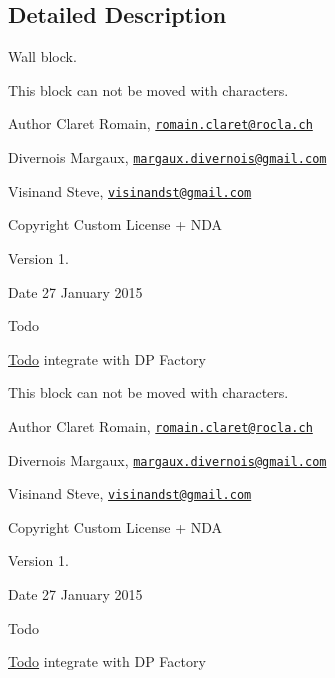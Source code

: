 \subsection{Detailed Description}
Wall block. 

This block can not be moved with characters. \begin{DoxyAuthor}{Author}
Claret Romain, \href{mailto:romain.claret@rocla.ch}{\tt romain.\+claret@rocla.\+ch} 

Divernois Margaux, \href{mailto:margaux.divernois@gmail.com}{\tt margaux.\+divernois@gmail.\+com} 

Visinand Steve, \href{mailto:visinandst@gmail.com}{\tt visinandst@gmail.\+com} 
\end{DoxyAuthor}
\begin{DoxyCopyright}{Copyright}
Custom License + N\+D\+A 
\end{DoxyCopyright}
\begin{DoxyVersion}{Version}
1. 
\end{DoxyVersion}
\begin{DoxyDate}{Date}
27 January 2015 
\end{DoxyDate}
\begin{DoxyRefDesc}{Todo}
\item[\hyperlink{todo__todo000002}{Todo}]integrate with D\+P Factory \end{DoxyRefDesc}


This block can not be moved with characters. \begin{DoxyAuthor}{Author}
Claret Romain, \href{mailto:romain.claret@rocla.ch}{\tt romain.\+claret@rocla.\+ch} 

Divernois Margaux, \href{mailto:margaux.divernois@gmail.com}{\tt margaux.\+divernois@gmail.\+com} 

Visinand Steve, \href{mailto:visinandst@gmail.com}{\tt visinandst@gmail.\+com} 
\end{DoxyAuthor}
\begin{DoxyCopyright}{Copyright}
Custom License + N\+D\+A 
\end{DoxyCopyright}
\begin{DoxyVersion}{Version}
1. 
\end{DoxyVersion}
\begin{DoxyDate}{Date}
27 January 2015 
\end{DoxyDate}
\begin{DoxyRefDesc}{Todo}
\item[\hyperlink{todo__todo000011}{Todo}]integrate with D\+P Factory \end{DoxyRefDesc}


